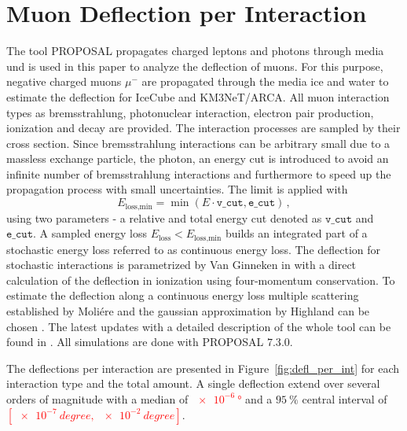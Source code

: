 \section{Muon Deflection per Interaction}\label{sec:defl_per_int}
The tool PROPOSAL propagates charged leptons and photons through media und is 
used in this paper to analyze the deflection of muons. For this purpose, 
negative charged muons $\mu^-$ are propagated through the media ice and water 
to estimate the deflection for IceCube and KM3NeT/ARCA. All muon interaction types as bremsstrahlung, photonuclear interaction, electron pair production, 
ionization and decay are provided. The interaction processes are sampled by their cross section. Since bremsstrahlung interactions can be 
arbitrary small due to a massless exchange particle, the photon, an energy cut is introduced to avoid an infinite number of bremsstrahlung interactions 
and furthermore to speed up the propagation process with small uncertainties.
The limit is applied with 
\begin{equation}
    E_{\text{loss,min}} = \min{(E \cdot \texttt{v\_cut}, \texttt{e\_cut})}\,,
\end{equation}
using two parameters - a relative and total energy cut denoted as 
$\texttt{v\_cut}$ and $\texttt{e\_cut}$. A sampled energy loss 
$E_{\text{loss}} < E_{\text{loss,min}}$ builds an integrated part of a 
stochastic energy loss referred to as continuous energy loss.
The deflection for stochastic interactions is parametrized by Van Ginneken 
in \cite{Van_Ginneken} with a direct calculation of the deflection in 
ionization using four-momentum conservation. To estimate the deflection along 
a continuous energy loss multiple scattering established by Moliére 
\cite{moliere_scattering} and the gaussian approximation by Highland 
can be chosen \cite{highland_scattering}. 
The latest updates with a detailed description of the whole tool can be found 
in \cite{phd_soedingrekso}.
All simulations are done with PROPOSAL $7.3.0$.


The deflections per interaction are presented in Figure~\ref{fig:defl_per_int} 
for each interaction type and the total amount. A single deflection 
extend over several orders of magnitude with a median of \textcolor{red}{$\SI{e-6}{\degree}$}
and a $\SI{95}{\percent}$ central interval of \textcolor{red}{$[\SI{e-7}{degree}, \,\SI{e-2}{degree}]$}.

